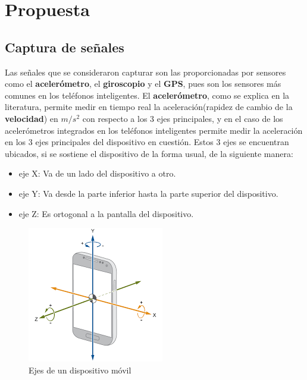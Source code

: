 \chapter{Propuesta}\label{chapter:proposal}

\section{Captura de señales}
	Las señales que se consideraron capturar son las proporcionadas por sensores como el \textbf{acelerómetro},
	el \textbf{giroscopio} y el \textbf{GPS}, pues son los sensores más comunes en los teléfonos inteligentes. El
	\textbf{acelerómetro}, como se explica en la literatura, permite medir en tiempo real la aceleración(rapidez de
	cambio de la \textbf{velocidad}) en $m/s^2$ con respecto a los 3 ejes principales, y en el caso de los
	acelerómetros integrados en los teléfonos inteligentes permite medir la aceleración en los 3 ejes
	principales del dispositivo en cuestión. Estos 3 ejes se encuentran ubicados, si se sostiene el
	dispositivo de la forma usual, de la siguiente manera:

	\begin{itemize}
		\item eje X: Va de un lado del dispositivo a otro.
		\item eje Y: Va desde la parte inferior hasta la parte superior del dispositivo.
		\item eje Z: Es ortogonal a la pantalla del dispositivo.
	\end{itemize}
	
	\begin{figure}[htb]
		\centering
		\includegraphics[scale = 0.5]{Graphics/mobile_phone_axis.png}
		\caption{Ejes de un dispositivo móvil}
		\label{fig:1}
	\end{figure}

